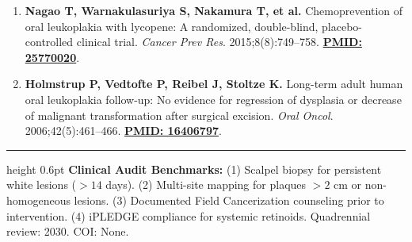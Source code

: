 \documentclass[9pt,a4paper]{article}
\begin{document}
\begin{enumerate}
    \item \textbf{Nagao T, Warnakulasuriya S, Nakamura T, et al.} Chemoprevention of oral leukoplakia with lycopene: A randomized, double-blind, placebo-controlled clinical trial. \textit{Cancer Prev Res}. 2015;8(8):749--758. \href{https://pubmed.ncbi.nlm.nih.gov/25770020/}{\textbf{PMID: 25770020}}.
    \item \textbf{Holmstrup P, Vedtofte P, Reibel J, Stoltze K.} Long-term adult human oral leukoplakia follow-up: No evidence for regression of dysplasia or decrease of malignant transformation after surgical excision. \textit{Oral Oncol}. 2006;42(5):461--466. \href{https://pubmed.ncbi.nlm.nih.gov/16406797/}{\textbf{PMID: 16406797}}.
\end{enumerate}

\vspace{5pt}
\hrule height 0.6pt\vspace{3pt}
\footnotesize\textbf{Clinical Audit Benchmarks:} (1) Scalpel biopsy for persistent white lesions ($>14$ days). (2) Multi-site mapping for plaques $>2\text{ cm}$ or non-homogeneous lesions. (3) Documented Field Cancerization counseling prior to intervention. (4) iPLEDGE compliance for systemic retinoids. Quadrennial review: 2030. COI: None.
\end{document}
